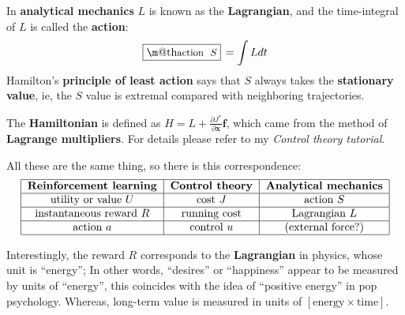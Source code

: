 \documentclass[orivec]{llncs}
\makeatletter
\newcommand{\emp}[1]{\textbf{#1}}
\newcommand{\vect}[1]{\boldsymbol{#1}}
\renewcommand{\boxed}[1]{\fbox{\m@th$\displaystyle\scalebox{0.9}{#1}$} \,}
\makeatother
\begin{document}
	
	In \emp{analytical mechanics} $L$ is known as the \textbf{Lagrangian}, and the time-integral of $L$ is called the \textbf{action}:
	\begin{equation}
	\boxed{\mbox{action } $S$} = \int L dt
	\end{equation}
	Hamilton's \emp{principle of least action} says that $S$ always takes the \textbf{stationary value}, ie, the $S$ value is extremal compared with neighboring trajectories.
	
	The \textbf{Hamiltonian} is defined as $\displaystyle H = L + \frac{\partial J^*}{\partial \vect{x}} \vect{f}$, which came from the method of \textbf{Lagrange multipliers}.  For details please refer to my \textit{Control theory tutorial}\cite{YanControlTheoryTutorial}.
	
	All these are the same thing, so there is this correspondence:
	\begin{equation}
	\begin{tabular}{|c|c|c|}
	\hline 
	\emp{Reinforcement learning} & \emp{Control theory} & \emp{Analytical mechanics} \\ 
	\hline
	utility or value $U$ & cost $J$ & action $S$ \\ 
	\hline 
	instantaneous reward $R$ & running cost & Lagrangian $L$ \\ 
	\hline 
	action $a$ & control $u$ & (external force?) \\
	\hline
	\end{tabular} 
	\end{equation}
	
	
	Interestingly, the reward $R$ corresponds to the \textbf{Lagrangian} in physics, whose unit is ``energy'';  In other words, ``desires'' or ``happiness'' appear to be measured by units of ``energy'', this coincides with the idea of ``positive energy'' in pop psychology.  Whereas, long-term value is measured in units of $[\mbox{energy} \times \mbox{time}]$.
	
\end{document}
